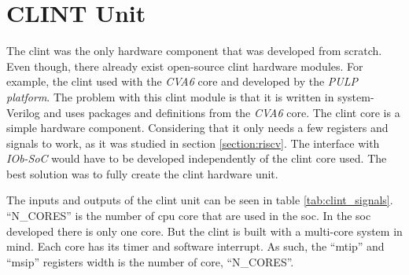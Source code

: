 \section{CLINT Unit}
\label{section:clint}
The \acrshort{clint} was the only hardware component that was developed from scratch. Even though, there already exist open-source \acrfull{clint} hardware modules. For example, the \acrshort{clint} used with the \textit{CVA6} core and developed by the \textit{PULP platform}. The problem with this \acrshort{clint} module is that it is written in system-Verilog and uses packages and definitions from the \textit{CVA6} core. The \acrshort{clint} core is a simple hardware component. Considering that it only needs a few registers and signals to work, as it was studied in section \ref{section:riscv}. The interface with \textit{IOb-SoC} would have to be developed independently of the \acrshort{clint} core used. The best solution was to fully create the \acrshort{clint} hardware unit.

The inputs and outputs of the \acrshort{clint} unit can be seen in table \ref{tab:clint_signals}. \enquote{N\_CORES} is the number of \acrshort{cpu} core that are used in the \acrshort{soc}. In the \acrfull{soc} developed there is only one core. But the \acrshort{clint} is built with a multi-core system in mind. Each core has its timer and software interrupt. As such, the \enquote{mtip} and \enquote{msip} registers width is the number of core, \enquote{N\_CORES}.

